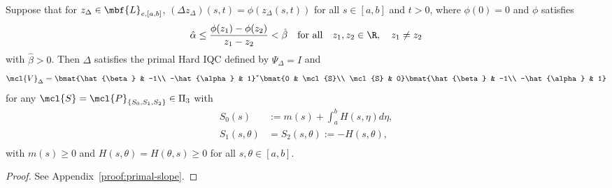 \begin{lemma}
Suppose that for $z_\Delta\in\mbf{L}_{e,[a,b]}$, $(\Delta z_\Delta)(s,t) = \phi(z_\Delta(s,t))$ for all
$s\in[a,b]$ and $t>0$, where $\phi(0)=0$ and $\phi$ satisfies
\begin{equation*}
    \hat{\alpha}\leq\frac{\phi(z_1)-\phi(z_2)}{z_1-z_2}<\hat{\beta}
    \quad \text{for all} \quad z_1,z_2\in\R,\quad z_1\neq z_2
\end{equation*}
with $\hat{\beta}>0$. Then $\Delta$ satisfies the primal Hard IQC defined by $\Psi_\Delta=I$
and
\begin{equation}\label{eqn:primal-slope-mult}
    \mcl{V}_\Delta = \bmat{\hat{\beta} & -1\\ -\hat{\alpha} & 1}^*
    \bmat{0 & \mcl{S}\\ \mcl{S} & 0}\bmat{\hat{\beta} & -1\\ -\hat{\alpha} & 1}
\end{equation}
for any $\mcl{S}=\mcl{P}_{\{S_0,S_1,S_2\}}\in\Pi_3$ with
\begin{equation*}
\begin{aligned}
    S_0(s)&:=m(s)+\int_a^b H(s,\eta)d\eta,\\
    S_1(s,\theta)& = S_2(s,\theta):=-H(s,\theta),\\
\end{aligned}
\end{equation*}
with $m(s)\geq0$ and
$H(s,\theta)=H(\theta,s)\geq0$ for all $s,\theta\in[a,b]$.
\end{lemma}
\begin{proof}
    See Appendix~\ref{proof:primal-slope}.
\end{proof}

